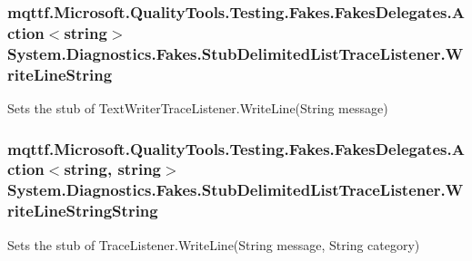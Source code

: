 \hypertarget{class_system_1_1_diagnostics_1_1_fakes_1_1_stub_delimited_list_trace_listener_aaaacbc6e31b66c0b7c93800ac97fb965}{
\subsubsection[{Write\-Line\-String}]{\setlength{\rightskip}{0pt plus 5cm}mqttf.\-Microsoft.\-Quality\-Tools.\-Testing.\-Fakes.\-Fakes\-Delegates.\-Action$<$string$>$ System.\-Diagnostics.\-Fakes.\-Stub\-Delimited\-List\-Trace\-Listener.\-Write\-Line\-String}}\label{class_system_1_1_diagnostics_1_1_fakes_1_1_stub_delimited_list_trace_listener_aaaacbc6e31b66c0b7c93800ac97fb965}


Sets the stub of Text\-Writer\-Trace\-Listener.\-Write\-Line(\-String message)

\hypertarget{class_system_1_1_diagnostics_1_1_fakes_1_1_stub_delimited_list_trace_listener_ab21c474b1bc8643e6ad57c124a6e8420}{
\subsubsection[{Write\-Line\-String\-String}]{\setlength{\rightskip}{0pt plus 5cm}mqttf.\-Microsoft.\-Quality\-Tools.\-Testing.\-Fakes.\-Fakes\-Delegates.\-Action$<$string, string$>$ System.\-Diagnostics.\-Fakes.\-Stub\-Delimited\-List\-Trace\-Listener.\-Write\-Line\-String\-String}}\label{class_system_1_1_diagnostics_1_1_fakes_1_1_stub_delimited_list_trace_listener_ab21c474b1bc8643e6ad57c124a6e8420}


Sets the stub of Trace\-Listener.\-Write\-Line(\-String message, String category)

